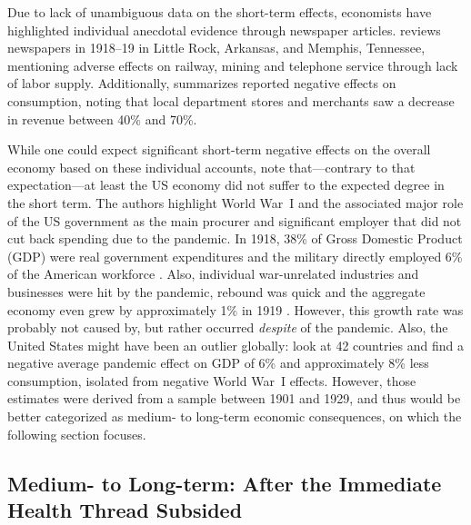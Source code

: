 \documentclass[12pt,a4paper]{article}
\begin{document}
Due to lack of unambiguous data on the short-term effects, economists have highlighted individual anecdotal evidence through newspaper articles.
\cite{garrettEconomicEffects19182007} reviews newspapers in 1918--19 in Little Rock, Arkansas, and Memphis, Tennessee, mentioning adverse effects on railway, mining and telephone service through lack of labor supply.
Additionally, \cite{garrettEconomicEffects19182007} summarizes reported negative effects on consumption, noting that local department stores and merchants saw a decrease in revenue between 40\% and 70\%.

While one could expect significant short-term negative effects on the overall economy based on these individual accounts, \cite{benmelech1918InfluenzaDid2020} note that---contrary to that expectation---at least the US economy did not suffer to the expected degree in the short term.
The authors highlight World War~I and the associated major role of the US government as the main procurer and significant employer that did not cut back spending due to the pandemic.
In 1918, 38\% of Gross Domestic Product (GDP) were real government expenditures and the military directly employed 6\% of the American workforce \citep{benmelech1918InfluenzaDid2020}.
Also, individual war-unrelated industries and businesses were hit by the pandemic, rebound was quick and the aggregate economy even grew by approximately 1\% in 1919 \citep{romerWorldWarPostwar1988}.
However, this growth rate was probably not caused by, but rather occurred \textit{despite} of the pandemic.
Also, the United States might have been an outlier globally:
\cite{barroCoronavirusGreatInfluenza2020} look at 42 countries and find a negative average pandemic effect on GDP of 6\% and approximately 8\% less consumption, isolated from negative World War~I effects.
However, those estimates were derived from a sample between 1901 and 1929, and thus would be better categorized as medium- to long-term economic consequences, on which the following section focuses.


\subsection{Medium- to Long-term: After the Immediate Health Thread Subsided} \label{sec:medlong}
\end{document}
